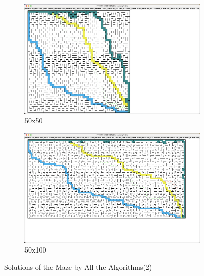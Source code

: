 \documentclass{article}
\begin{document}
\begin{figure}[p]
    \centering
    \begin{subfigure}[b]{1\textwidth}
        \centering
        \includegraphics[width=1\textwidth]{imgs/s_50.eps}
        \caption{50x50}
    \end{subfigure}
    \newline
    \begin{subfigure}[b]{1\textwidth}
        \centering
        \includegraphics[width=1\textwidth]{imgs/s_50_100.eps}
        \caption{50x100}
    \end{subfigure}
    \caption{Solutions of the Maze by All the Algorithms(2)}
\end{figure}

\newpage


\newpage
\appendix
\end{document}
